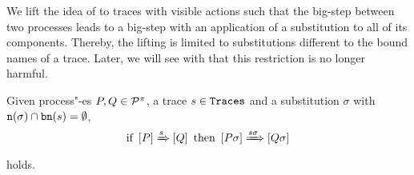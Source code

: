 
We lift the idea of  to traces with visible actions such that the big-step between two processes leads to a big-step with an application of a substitution to all of its components. Thereby, the lifting is limited to substitutions different to the bound names of a trace. Later, we will see with  that this restriction is no longer harmful.

\begin{lemma}
\label{lem_subst_bigstep_partII}
Given process"-es $P,Q\in\mathcal P^{\pi}$, a trace $s\in\mathtt{Traces}$ and a substitution $\sigma$ with $\mathtt{n}(\sigma)\cap\mathtt{bn}(s)=\emptyset$,
\[\text{if } \left[P\right]\xRightarrow{s}\left[Q\right] \text{ then } \left[P\sigma\right]\xRightarrow{s\sigma}\left[Q\sigma\right]\]
holds.
\end{lemma}
